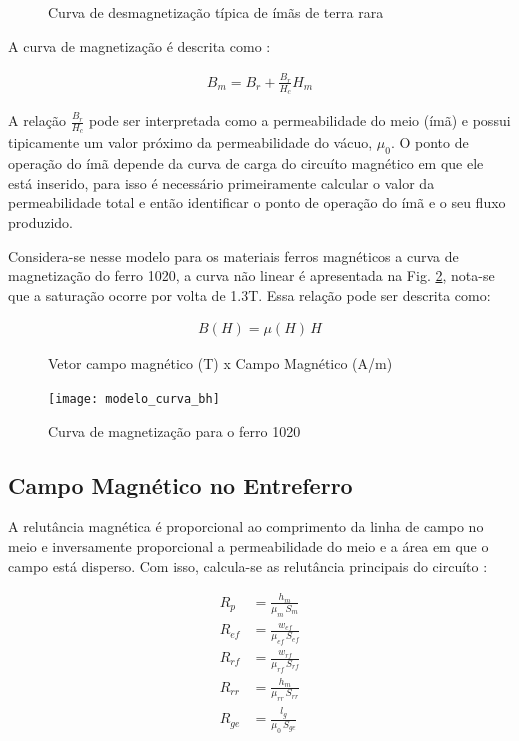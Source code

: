 \begin{figure}[!ht]
	\centering
	\def\svgwidth{0.7\columnwidth}
	
	\caption{Curva de desmagnetização típica de ímãs de terra rara}
	\label{Fig:Modelagem:circuito:passivo:ima}
\end{figure}

A curva de magnetização é descrita como :

\begin{align}
B_m = B_r + \frac{B_r}{H_c} H_m
\label{eq:p:ima}
\end{align}

A relação $\frac{B_r}{H_c}$ pode ser interpretada como a permeabilidade do meio (ímã) e possui tipicamente um valor próximo da permeabilidade do vácuo, $\mu_0$. O ponto de operação do ímã depende da curva de carga do circuíto magnético em que ele está inserido, para isso é necessário primeiramente calcular o valor da permeabilidade total e então identificar o ponto de operação do ímã e o seu fluxo produzido.

Considera-se nesse modelo para os materiais ferros magnéticos a curva de magnetização do ferro 1020, a curva não linear é apresentada na Fig. \ref{Fig:Modelagem:BH}, nota-se que a saturação ocorre por volta de 1.3T. Essa relação pode ser descrita como:

\begin{align}
B(H) = \mu(H) \, H
\label{eq:p:BH:ferro}
\end{align}

\begin{figure}[!ht]
	\centering
	\caption*{ Vetor campo magnético (T) x Campo Magnético (A/m)}
	\texttt{[image: modelo\_curva\_bh]}
	\caption{Curva de magnetização para o ferro 1020}
	\label{Fig:Modelagem:BH}
\end{figure}


\subsection{Campo Magnético no Entreferro}

A relutância magnética é proporcional ao comprimento da linha de campo no meio e inversamente proporcional a permeabilidade do meio e a área em que o campo está disperso. Com isso, calcula-se as relutância principais do circuíto :

\begin{align}
R_{p}  &= \frac{h_m}{\mu_m \, S_m}			\\
R_{ef} &= \frac{w_{ef}}{\mu_{ef}\, S_{ef}}  \\     
R_{rf} &= \frac{w_{rf}}{\mu_{rf}\, S_{rf}}   \\    
R_{rr} &= \frac{h_m}{\mu_{rr} \, S_{rr}}     \\      
R_{ge} &= \frac{l_g}{\mu_0  \, S_{ge}}        
\end{align}

